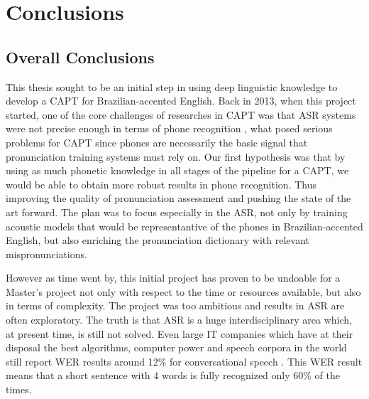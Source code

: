 \chapter{Conclusions}\label{ch:conclusions}

\section*{Overall Conclusions}\label{sec:overall-conclusions}

This thesis sought to be an initial step in using deep linguistic knowledge to develop a \ac{CAPT} for Brazilian-accented English. Back in 2013, when this project started, one of the core challenges of researches in \ac{CAPT} was that \ac{ASR} systems were not precise enough in terms of phone recognition \cite{Witt2012}, what posed serious problems for \ac{CAPT} since phones are necessarily the basic signal that pronunciation training systems must rely on. Our first hypothesis was that by using as much phonetic knowledge in all stages of the pipeline for a \ac{CAPT}, we would be able to obtain more robust results in  phone recognition. Thus improving the quality of pronunciation assessment and pushing the state of the art forward. The plan was to focus especially in the \ac{ASR}, not only by training acoustic models that would be representantive of the phones in Brazilian-accented English, but also enriching the pronunciation dictionary with relevant mispronunciations. 

However as time went by, this initial project has proven to be undoable for a Master's project not only with respect to the time or resources available, but also in terms of complexity. The project was too ambitious and results in \ac{ASR} are often exploratory. The truth is that \ac{ASR} is a huge interdisciplinary area which, at present time, is still not solved. Even large IT companies which have at their disposal the best algorithms, computer power and speech corpora in the world still report \ac{WER} results around 12\% for conversational speech  \cite{Huang2014}. This \ac{WER} result means that a short sentence with 4 words is fully recognized only 60\% of the times.

